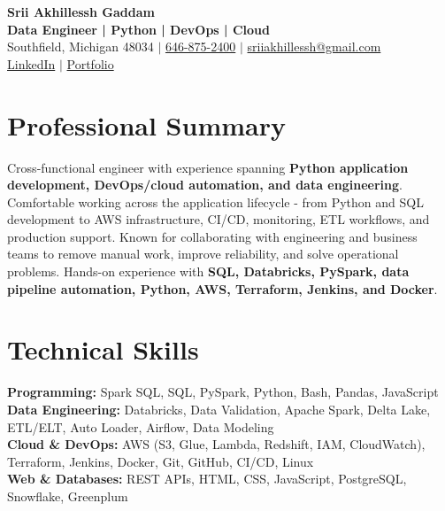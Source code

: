 \documentclass[letterpaper,10pt]{article}
\begin{document}
\fontsize{9.35pt}{10.45pt}\selectfont

\begin{center}
    {\LARGE \textbf{Srii Akhillessh Gaddam}} \\[-1pt]
    \textbf{Data Engineer | Python | DevOps | Cloud} \\[2pt]
    Southfield, Michigan 48034 $|$
    \href{tel:6468752400}{646-875-2400} $|$
    \href{mailto:sriiakhillessh@gmail.com}{sriiakhillessh@gmail.com} \\[1pt]
    \href{https://www.linkedin.com/in/srii-akhiilessh-gaddam-b48668191/}{LinkedIn} $|$
    \href{https://sriiakhillesshg.github.io/portfolio/}{Portfolio}
\end{center}
\vspace{-8pt}

\section{Professional Summary}
\small{Cross-functional engineer with experience spanning \textbf{Python application development, DevOps/cloud automation, and data engineering}. Comfortable working across the application lifecycle - from Python and SQL development to AWS infrastructure, CI/CD, monitoring, ETL workflows, and production support. Known for collaborating with engineering and business teams to remove manual work, improve reliability, and solve operational problems. Hands-on experience with \textbf{SQL, Databricks, PySpark, data pipeline automation, Python, AWS, Terraform, Jenkins, and Docker}.}

\section{Technical Skills}
\small{
\textbf{Programming:} Spark SQL, SQL, PySpark, Python, Bash, Pandas, JavaScript \\
\textbf{Data Engineering:} Databricks, Data Validation, Apache Spark, Delta Lake, ETL/ELT, Auto Loader, Airflow, Data Modeling \\
\textbf{Cloud \& DevOps:} AWS (S3, Glue, Lambda, Redshift, IAM, CloudWatch), Terraform, Jenkins, Docker, Git, GitHub, CI/CD, Linux \\
\textbf{Web \& Databases:} REST APIs, HTML, CSS, JavaScript, PostgreSQL, Snowflake, Greenplum
}

\end{document}
